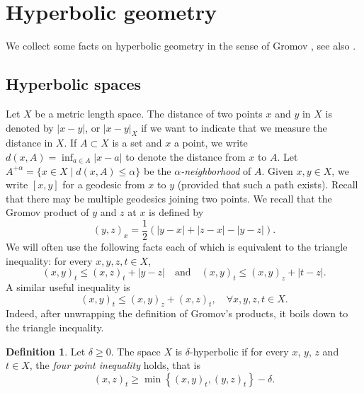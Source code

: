 \documentclass[JEP,XML,SOM,Unicode, NoEqCountersInSection,published]{cedram}
\theoremstyle{plain}
\theoremstyle{definition}
\newtheorem{df}[thm]{Definition}
\begin{document}
\section{Hyperbolic geometry}

We collect some facts on hyperbolic geometry in the sense of Gromov \cite{gromov_hyperbolic_1987}, see also \cite{coornaert_geometry_1990,ghys_hyperboliques_1990}.

\subsection{Hyperbolic spaces}
\label{sec: Hyperbolic spaces}

Let $X$ be a metric length space. The distance of two points $x$ and $y$ in $X$ is denoted by $|x-y|$, or $|x-y|_X$ if we want to indicate that we measure the distance in $X$. If $A\subset X$ is a set and $x$ a point, we write $d(x,A)=\inf_{a\in A}|x-a|$ to denote the distance from $x$ to $A$.
Let $A^{+\alpha}=\{x\in X\mid d(x,A) \leqslant \alpha\}$ be the \emph{$\alpha$-neighborhood} of $A$.
Given $x, y \in X$, we write $[x,y]$ for a geodesic from $x$ to $y$ (provided that such a path exists).
Recall that there may be multiple geodesics joining two points.
We recall that the Gromov product of $y$ and $z$ at $x$ is defined by
\[
(y,z)_x=\frac{1}{2}\left( |y-x| + |z-x| - |y-z|\right).
\]
We will often use the following facts each of which is equivalent to the triangle inequality: for every $x,y,z,t \in X$,
\begin{equation*}
(x,y)_t \leq (x,z)_t + |y - z|
\quad \text{and} \quad
(x,y)_t \leq (x,y)_z + |t-z|.
\end{equation*}
A similar useful inequality is
\begin{equation}
\label{eqn: triangle inequality gromov product}
(x,y)_t \leq (x,y)_z + (x,z)_t, \quad \forall x,y,z,t \in X.
\end{equation}
Indeed, after unwrapping the definition of Gromov's products, it boils down to the triangle inequality.

\begin{df}
Let $\delta\geqslant 0$. The space $X$ is $\delta$-hyperbolic if for every $x$, $y$, $z$ and $t\in X$, the \emph{four point inequality} holds, that is
\begin{equation}
\label{eqn: four point inequality}
(x,z)_t\geqslant \min \left\{ (x,y)_t,(y,z)_t\right\}- \delta.
\end{equation}
\end{df}
\end{document}
